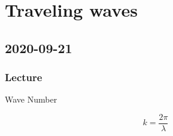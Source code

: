 \chapter{Traveling waves}

\section{2020-09-21}

\subsection{Lecture}

Wave Number

$$k = \frac{2\pi}{\lambda}$$